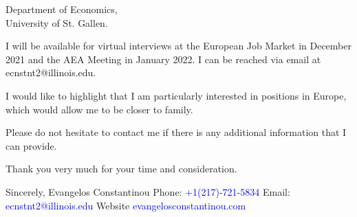 \documentclass[12pt]{letter}
\begin{document}
\begin{letter}{Department of Economics,\\
University of St. Gallen.}





I will be available for virtual interviews at the European Job Market in December 2021 and the AEA Meeting in January 2022.
I can be reached via email at ecnstnt2@illinois.edu.


I would like to highlight that I am particularly interested in positions in Europe, which would allow me to be closer to family.

Please do not hesitate to contact me if there is any additional information that I can provide.


Thank you very much for your time and consideration.


\noindent Sincerely,
\newline\noindent Evangelos Constantinou
\vspace{4mm}
\newline\noindent Phone: \textcolor{blue}{+1(217)-721-5834}
\newline\noindent Email: \textcolor{blue}{ecnstnt2@illinois.edu}
\newline\noindent Website \textcolor{blue}{evangelosconstantinou.com}
\end{letter}
\end{document}

